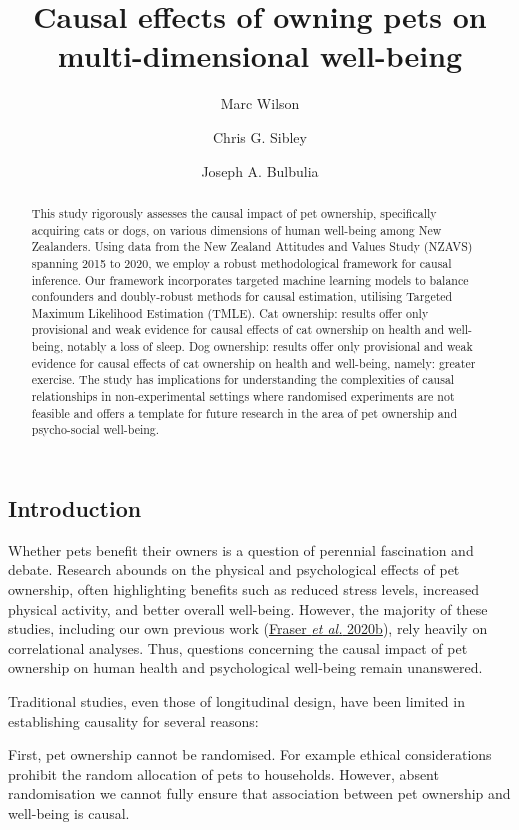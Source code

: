 \documentclass[
  singlecolumn,
  9pt]{article}
\title{Causal effects of owning pets on multi-dimensional well-being}
\author{Marc Wilson}
\affil{%
                  Victoria University of Wellington, New Zealand
              }
\author{Chris G. Sibley}
\affil{%
                  School of Psychology, University of Auckland
              }
\author{Joseph A. Bulbulia}
\affil{%
                  Victoria University of Wellington, New Zealand
              }
\date{}
\begin{document}
\maketitle
\begin{abstract}
This study rigorously assesses the causal impact of pet ownership,
specifically acquiring cats or dogs, on various dimensions of human
well-being among New Zealanders. Using data from the New Zealand
Attitudes and Values Study (NZAVS) spanning 2015 to 2020, we employ a
robust methodological framework for causal inference. Our framework
incorporates targeted machine learning models to balance confounders and
doubly-robust methods for causal estimation, utilising Targeted Maximum
Likelihood Estimation (TMLE). Cat ownership: results offer only
provisional and weak evidence for causal effects of cat ownership on
health and well-being, notably a loss of sleep. Dog ownership: results
offer only provisional and weak evidence for causal effects of cat
ownership on health and well-being, namely: greater exercise. The study
has implications for understanding the complexities of causal
relationships in non-experimental settings where randomised experiments
are not feasible and offers a template for future research in the area
of pet ownership and psycho-social well-being.
\end{abstract}
\subsection{Introduction}\label{introduction}

Whether pets benefit their owners is a question of perennial fascination
and debate. Research abounds on the physical and psychological effects
of pet ownership, often highlighting benefits such as reduced stress
levels, increased physical activity, and better overall well-being.
However, the majority of these studies, including our own previous work
(\hyperref[ref-fraser2020]{Fraser \emph{et al.} 2020b}), rely heavily on
correlational analyses. Thus, questions concerning the causal impact of
pet ownership on human health and psychological well-being remain
unanswered.

Traditional studies, even those of longitudinal design, have been
limited in establishing causality for several reasons:

First, pet ownership cannot be randomised. For example ethical
considerations prohibit the random allocation of pets to households.
However, absent randomisation we cannot fully ensure that association
between pet ownership and well-being is causal.
\end{document}
